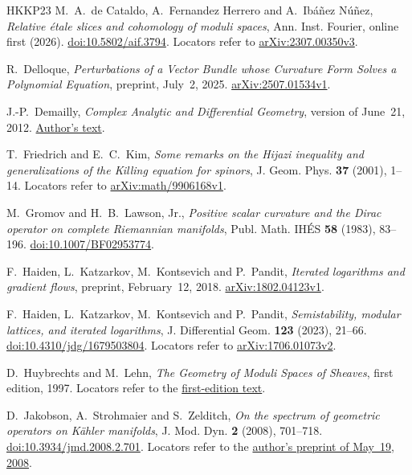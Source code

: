 \begin{thebibliography}{HKKP23}
M.~A.~de Cataldo, A.~Fernandez Herrero and A.~Ibáñez Núñez,
\emph{Relative étale slices and cohomology of moduli spaces},
Ann. Inst. Fourier, online first (2026).
\href{https://doi.org/10.5802/aif.3794}{doi:10.5802/aif.3794}.
Locators refer to \href{https://arxiv.org/abs/2307.00350v3}{arXiv:2307.00350v3}.

R.~Delloque, \emph{Perturbations of a Vector Bundle whose Curvature Form
Solves a Polynomial Equation}, preprint, July~2, 2025.
\href{https://arxiv.org/abs/2507.01534v1}{arXiv:2507.01534v1}.

J.-P.~Demailly, \emph{Complex Analytic and Differential Geometry},
version of June~21, 2012.
\href{https://www-fourier.univ-grenoble-alpes.fr/~demailly/manuscripts/agbook.pdf}
{Author's text}.

T.~Friedrich and E.~C.~Kim,
\emph{Some remarks on the Hijazi inequality and generalizations of the
Killing equation for spinors}, J. Geom. Phys. \textbf{37} (2001), 1--14.
Locators refer to \href{https://arxiv.org/abs/math/9906168v1}{arXiv:math/9906168v1}.

M.~Gromov and H.~B.~Lawson, Jr.,
\emph{Positive scalar curvature and the Dirac operator on complete
Riemannian manifolds}, Publ. Math. IHÉS
\textbf{58} (1983), 83--196.
\href{https://doi.org/10.1007/BF02953774}{doi:10.1007/BF02953774}.

F.~Haiden, L.~Katzarkov, M.~Kontsevich and P.~Pandit,
\emph{Iterated logarithms and gradient flows}, preprint, February~12, 2018.
\href{https://arxiv.org/abs/1802.04123v1}{arXiv:1802.04123v1}.

F.~Haiden, L.~Katzarkov, M.~Kontsevich and P.~Pandit,
\emph{Semistability, modular lattices, and iterated logarithms},
J. Differential Geom. \textbf{123} (2023), 21--66.
\href{https://doi.org/10.4310/jdg/1679503804}{doi:10.4310/jdg/1679503804}.
Locators refer to \href{https://arxiv.org/abs/1706.01073v2}{arXiv:1706.01073v2}.

D.~Huybrechts and M.~Lehn,
\emph{The Geometry of Moduli Spaces of Sheaves}, first edition, 1997.
Locators refer to the
\href{https://ncatlab.org/nlab/files/HuybrechtsLehn.pdf}
{first-edition text}.

D.~Jakobson, A.~Strohmaier and S.~Zelditch,
\emph{On the spectrum of geometric operators on Kähler manifolds},
J. Mod. Dyn. \textbf{2} (2008), 701--718.
\href{https://doi.org/10.3934/jmd.2008.2.701}{doi:10.3934/jmd.2008.2.701}.
Locators refer to the
\href{https://www.math.mcgill.ca/jakobson/papers/kaehler.pdf}
{author's preprint of May~19, 2008}.


\end{thebibliography}
